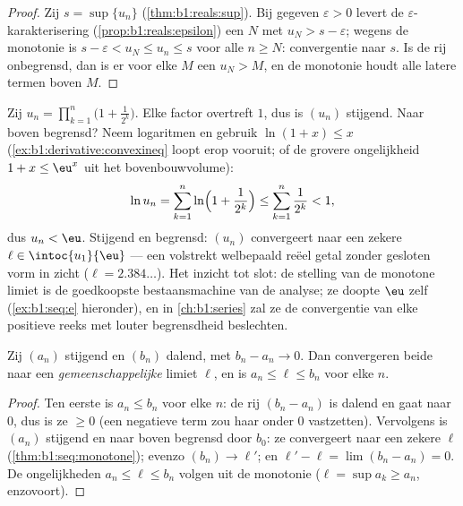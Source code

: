 \begin{proof}
Zij $s = \sup\{u_n\}$ (\cref{thm:b1:reals:sup}). Bij gegeven $\varepsilon
> 0$ levert de $\varepsilon$-karakterisering
(\cref{prop:b1:reals:epsilon}) een $N$ met $u_N > s - \varepsilon$;
wegens de monotonie is $s - \varepsilon < u_N \leq u_n \leq s$ voor alle
$n \geq N$: convergentie naar $s$. Is de rij onbegrensd, dan is er voor
elke $M$ een $u_N > M$, en de monotonie houdt alle latere termen boven
$M$.
\end{proof}

\begin{example}\label{ex:b1:seq:existencemachine}
Zij $u_n = \prod_{k=1}^{n} \bigl(1 + \frac{1}{2^k}\bigr)$. Elke factor
overtreft $1$, dus is $(u_n)$ stijgend. Naar boven begrensd? Neem
logaritmen en gebruik $\ln(1 + x) \leq x$
(\cref{ex:b1:derivative:convexineq} loopt erop vooruit; of de grovere
ongelijkheid $1 + x \leq \eu^x$ uit het bovenbouwvolume):
\[
\ln u_n = \sum_{k=1}^{n} \ln\Bigl(1 + \frac{1}{2^k}\Bigr)
\leq \sum_{k=1}^{n} \frac{1}{2^k} < 1 ,
\]
dus $u_n < \eu$. Stijgend en begrensd: $(u_n)$ convergeert naar een
zekere $\ell \in \intoc{u_1}{\eu}$ --- een volstrekt welbepaald reëel
getal zonder gesloten vorm in zicht ($\ell = 2.384\dots$). Het inzicht
tot slot: de stelling van de monotone limiet is de goedkoopste
bestaansmachine van de analyse; ze doopte $\eu$ zelf
(\cref{ex:b1:seq:e} hieronder), en in \cref{ch:b1:series} zal ze de
convergentie van elke positieve reeks met louter begrensdheid
beslechten.
\end{example}

\begin{theorem}\label{thm:b1:seq:adjacent}
Zij $(a_n)$ stijgend en $(b_n)$ dalend, met $b_n - a_n \to 0$. Dan
convergeren beide naar een \emph{gemeenschappelijke} limiet $\ell$, en is
$a_n \leq \ell \leq b_n$ voor elke $n$.
\end{theorem}

\begin{proof}
Ten eerste is $a_n \leq b_n$ voor elke $n$: de rij $(b_n - a_n)$ is
dalend en gaat naar $0$, dus is ze $\geq 0$ (een negatieve term zou haar
onder $0$ vastzetten). Vervolgens is $(a_n)$ stijgend en naar boven
begrensd door $b_0$: ze convergeert naar een zekere $\ell$
(\cref{thm:b1:seq:monotone}); evenzo $(b_n) \to \ell'$; en $\ell' - \ell
= \lim (b_n - a_n) = 0$. De ongelijkheden $a_n \leq \ell \leq b_n$ volgen
uit de monotonie ($\ell = \sup a_k \geq a_n$, enzovoort).
\end{proof}

